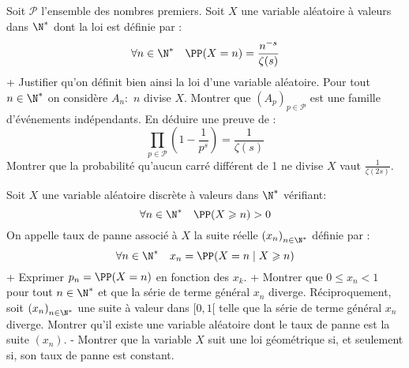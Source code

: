 \begin{exercise} Soit $\mathcal{P}$ l'ensemble des nombres premiers. Soit $X$ une variable aléatoire à valeurs dans $\N^{*}$ dont la loi est définie par :
\begin{equation*}
\forall n \in \N^{*} \quad \PP(X=n)=\frac{n^{-s}}{\zeta(s)}
\end{equation*}
\question+ Justifier qu'on définit bien ainsi la loi d'une variable aléatoire.
\question Pour tout $n \in \N^{*}$ on considère $A_{n}:$  \og $n$ divise $X$\fg. Montrer que $\left(A_{p}\right)_{p \in \mathcal{P}}$ est une famille d'événements indépendants. En déduire une preuve  de :
\begin{equation*}
\prod_{p \in \mathcal{P}}\left(1-\frac{1}{p^{s}}\right)=\frac{1}{\zeta(s)}
\end{equation*}
\question Montrer que la probabilité qu'aucun carré différent de 1 ne divise $X$ vaut $\frac{1}{\zeta(2 s)}$.
\endquestions 
\end{exercise}


\begin{exercise}[title=Taux de panne] 
Soit  $X$ une variable aléatoire discrète à valeurs dans $\N^{*}$ vérifiant:
\begin{equation*}
\forall n \in \N^{*} \quad \PP(X \geqslant n)>0
\end{equation*}
On appelle taux de panne associé à $X$ la suite réelle $\left(x_{n}\right)_{n \in \N^{*}}$ définie par :
\begin{equation*}
\forall n \in \N^{*} \quad x_{n}=\PP(X=n \mid X \geqslant n)
\end{equation*}
\question+ Exprimer $p_{n}=\PP(X=n)$ en fonction des $x_{k}$.
\question \question+ Montrer que $0 \leqslant x_{n}<1$ pour tout $n \in \N^{*}$ et que la série de terme général $x_{n}$ diverge.
\question Réciproquement, soit $\left(x_{n}\right)_{n \in \N^{*}}$ une suite à valeur dans $[0,1[$ telle que la série de terme général $x_{n}$ diverge. Montrer qu'il existe une variable aléatoire dont le taux de panne est la suite $\left(x_{n}\right)$.
\question- Montrer que la variable $X$ suit une loi géométrique si, et seulement si, son taux de panne est constant.
\endquestions 
\end{exercise}

